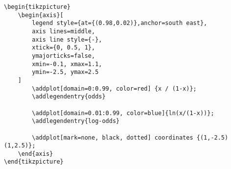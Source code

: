 \documentclass[12pt]{article}
\begin{document}
\begin{lstlisting}[]
\begin{tikzpicture}
	\begin{axis}[
		legend style={at={(0.98,0.02)},anchor=south east},
		axis lines=middle,
		axis line style={-},
		xtick={0, 0.5, 1},
		ymajorticks=false,
		xmin=-0.1, xmax=1.1,
		ymin=-2.5, ymax=2.5
	]
		\addplot[domain=0:0.99, color=red] {x / (1-x)};
		\addlegendentry{odds}
		
		\addplot[domain=0.01:0.99, color=blue]{ln(x/(1-x))};
		\addlegendentry{log-odds}

		\addplot[mark=none, black, dotted] coordinates {(1,-2.5) (1,2.5)};
	\end{axis}
\end{tikzpicture}
\end{lstlisting}
\end{document}
